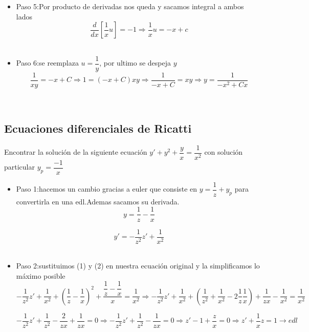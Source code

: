 \documentclass[10pt,a4paper]{article}
\begin{document}
{{{{{{{{{{{{\begin{itemize}
\item Paso 5:Por producto de derivadas nos queda y sacamos integral a ambos lados
\begin{equation*}
\dfrac{d}{dx}[\dfrac{1}{x}u]=-1\Rightarrow \dfrac{1}{x}u=-x+c 
\end{equation*}
\,\\

\item Paso 6:se reemplaza $u=\dfrac{1}{y}$, por ultimo se despeja $y$
\begin{equation*}
\dfrac{1}{xy} =-x+C\Rightarrow 1= (-x+C)xy \Rightarrow \dfrac{1}{-x+C}=xy\Rightarrow y=\dfrac{1}{-x ^{2}+Cx}
\end{equation*}

\end{itemize}
\,\\
\subsection{Ecuaciones diferenciales de Ricatti}
Encontrar  la solución de la siguiente ecuación $y'+y ^{2}+\dfrac{y}{x}=\dfrac{1}{x ^2}$ con solución particular $y_p=\dfrac{-1}{x}$
\begin{itemize}
\item Paso 1:hacemos un cambio gracias a euler que consiste en $y=\dfrac{1}{z}+y_p$ para convertirla en una edl.Ademas sacamos su derivada.
\begin{equation}\tag{1}
y=\dfrac{1}{z}-\dfrac{1}{x}
\end{equation}

\begin{equation}\tag{2}
y'=-\dfrac{1}{z ^2}z'+\dfrac{1}{x ^2}
\end{equation}
\,\\

\item Paso 2:sustituimos (1) y (2) en nuestra ecuación original y la simplificamos lo máximo posible
\begin{equation*}
-\dfrac{1}{z ^2}z'+\dfrac{1}{x ^2}+(\dfrac{1}{z}-\dfrac{1}{x}) ^{2}+\dfrac{\dfrac{1}{z}-\dfrac{1}{x}}{x}=\dfrac{1}{x ^2} \Rightarrow -\dfrac{1}{z ^2}z'+\dfrac{1}{x ^2}+(\dfrac{1}{z ^2}+\dfrac{1}{x ^2}-2\dfrac{1}{z}\dfrac{1}{x})+\dfrac{1}{zx}-\dfrac{1}{x ^2}=\dfrac{1}{x ^2}
\end{equation*}

\begin{equation*}
-\dfrac{1}{z ^2}z'+\dfrac{1}{z ^2}-\dfrac{2}{zx}+\dfrac{1}{zx}=0 \Rightarrow -\dfrac{1}{z ^2}z'+\dfrac{1}{z ^2} -\dfrac{1}{zx}=0\Rightarrow z'-1+\dfrac{z}{x}=0\Rightarrow z'+\dfrac{1}{x}z=1 \rightarrow edl
\end{equation*}


\end{itemize}}}}}}}}}}}}}
\end{document}
